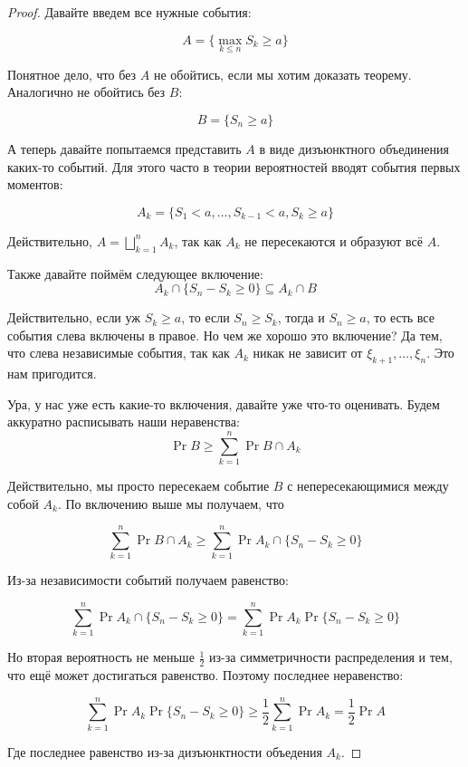 \begin{proof}
  Давайте введем все нужные события:

  \[
    A = \{\max\limits_{k \leq n} S_k \geq a\}
  \]

  Понятное дело, что без $A$ не обойтись, если мы хотим доказать теорему. Аналогично
  не обойтись без $B$:

  \[
    B = \{S_n \geq a\}
  \]

  А теперь давайте попытаемся представить $A$ в виде дизъюнктного объединения
  каких-то событий. Для этого часто в теории вероятностей вводят события первых
  моментов:

  \[
    A_k = \{S_1 < a, \ldots, S_{k - 1} < a, S_k \geq a\}
  \]

  Действительно, $A = \bigsqcup\limits_{k = 1}^n A_k$, так как
  $A_k$ не пересекаются и образуют всё $A$.

  Также давайте поймём следующее включение:
  \[
    A_k \cap \{S_n - S_k \geq 0\} \subseteq A_k \cap B
  \]

  Действительно, если уж $S_k \geq a$, то если $S_n \geq S_k$, тогда и
  $S_n \geq a$, то есть все события слева включены в правое. Но чем же хорошо
  это включение? Да тем, что слева независимые события, так как
  $A_k$ никак не зависит от $\xi_{k + 1}, \ldots, \xi_n$. Это нам пригодится.

  Ура, у нас уже
  есть какие-то включения, давайте уже что-то оценивать. Будем аккуратно
  расписывать наши неравенства:
  \[
    \Pr{B} \geq \sum\limits_{k = 1}^n \Pr{B \cap A_k}
  \]

  Действительно, мы просто пересекаем событие $B$ с непересекающимися между
  собой $A_k$. По включению выше мы получаем, что 

  \[
    \sum\limits_{k = 1}^n \Pr{B \cap A_k} \geq \sum\limits_{k = 1}^n \Pr{A_k
    \cap \{S_n - S_k \geq 0\}}
  \]

  Из-за независимости событий получаем равенство:

  \[
    \sum\limits_{k = 1}^n \Pr{A_k \cap \{S_n - S_k \geq 0\}} = 
    \sum\limits_{k = 1}^n \Pr{A_k} \Pr{\{S_n - S_k \geq 0\}}
  \]

  Но вторая вероятность не меньше $\frac12$ из-за симметричности распределения
  и тем, что ещё может достигаться равенство. Поэтому последнее неравенство:

  \[
    \sum\limits_{k = 1}^n \Pr{A_k} \Pr{\{S_n - S_k \geq 0\}} \geq
    \frac12\sum\limits_{k = 1}^n \Pr{A_k} = \frac12 \Pr{A}
  \]

  Где последнее равенство из-за дизъюнктности объедения $A_k$.
\end{proof}

